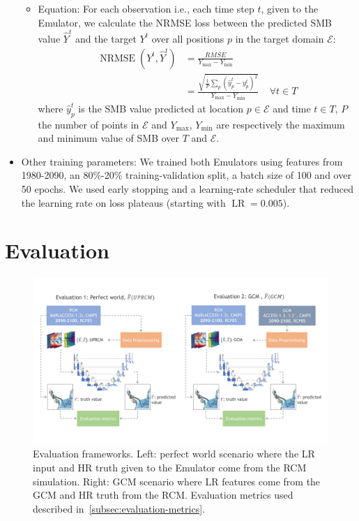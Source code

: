 \documentclass[a4paper,11pt,oneside]{report}
\begin{document}
\begin{itemize}
\begin{itemize}
        \item Equation: For each observation i.e., each time step $t$, given to the Emulator, we calculate the NRMSE loss between the predicted SMB value $\hat{Y}^{t}$ and the target $Y^{t}$ over all positions $p$ in the target domain $\mathcal{E}$:
        \begin{align}
        \operatorname{NRMSE}\left(Y^{t},\hat{Y}^{t}\right) &= \frac{RMSE}{Y_{\max} - Y_{\min}} \\
         &=\frac{\sqrt{\frac{1}{P}\sum_{p}(\hat{y}_{p}^{t}-y^{t}_{p})^2}}{Y_{\max} - Y_{\min}}   \;\;\;\; \forall t \in T
        \end{align}
        where $\hat{y}_{p}^{t}$ is the SMB value predicted at location $p\in \mathcal{E}$ and time $t \in T$, $P$ the number of points in $\mathcal{E}$ and $Y_{\max}$, $Y_{\min}$ are respectively the maximum and minimum value of SMB over $T$ and $\mathcal{E}$.
    \end{itemize}
    \item Other training parameters: We trained both Emulators using features from 1980-2090, an 80\%-20\% training-validation split, a batch size of 100 and over 50 epochs. We used early stopping and a learning-rate scheduler that reduced the learning rate on loss plateaus (starting with $\operatorname{LR} = 0.005$). 
\end{itemize}

\section{Evaluation}\label{sec:evaluation}

\begin{figure}[!t]
  \centering
  \includegraphics[width=\columnwidth]{doc/Thesis-latex/images/evaluation_framework.pdf}
  \caption []{\small Evaluation frameworks. Left: perfect world scenario where the LR input and HR truth given to the Emulator come from the RCM simulation. Right: GCM scenario where LR features come from the GCM and HR truth from the RCM. Evaluation metrics used described in~\ref{subsec:evaluation-metrics}.}
  \vspace{-3mm}
  \label{fig:evaluation-framework}
\end{figure}
\end{document}
